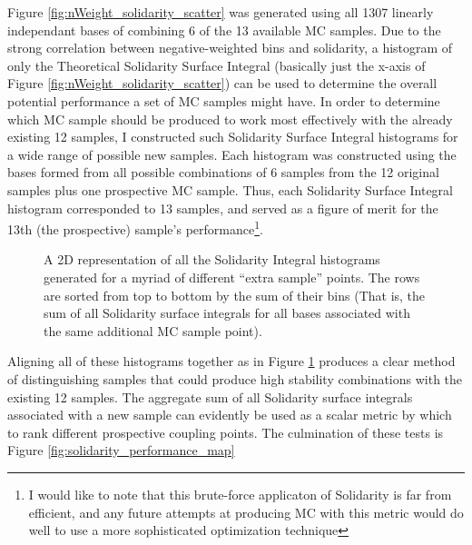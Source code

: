     Figure \ref{fig:nWeight_solidarity_scatter} was generated using all 1307 linearly independant bases of combining 6 of the 13 available MC samples.
    Due to the strong correlation between negative-weighted bins and solidarity,
        a histogram of only the Theoretical Solidarity Surface Integral
        (basically just the x-axis of Figure \ref{fig:nWeight_solidarity_scatter})
        can be used to determine the overall potential performance a set of MC samples might have.
    In order to determine which MC sample should be produced to work most effectively with the already existing 12 samples,
        I constructed such Solidarity Surface Integral histograms for a wide range of possible new samples.
    Each histogram was constructed using the bases formed from all possible combinations of 6 samples from
        the 12 original samples plus one prospective MC sample.
    Thus, each Solidarity Surface Integral histogram corresponded to 13 samples,
        and served as a figure of merit for the 13th (the prospective) sample's performance\footnote{
    I would like to note that this brute-force applicaton of Solidarity is far from efficient,
        and any future attempts at producing MC with this metric
        would do well to use a more sophisticated optimization technique}.

    \begin{figure}[tbh]
        \caption{
            A 2D representation of all the Solidarity Integral histograms generated for a myriad of different ``extra sample'' points.
            The rows are sorted from top to bottom by the sum of their bins
                (That is, the sum of all Solidarity surface integrals for all bases associated with the same additional MC sample point).
        }
        \label{fig:solidarity_dump}
    \end{figure}

    Aligning all of these histograms together as in Figure \ref{fig:solidarity_dump}
        produces a clear method of distinguishing samples that 
        could produce high stability combinations with the existing 12 samples.
    The aggregate sum of all Solidarity surface integrals associated with a new sample
        can evidently be used as a scalar metric by which to rank different prospective coupling points.
    The culmination of these tests is Figure \ref{fig:solidarity_performance_map}

